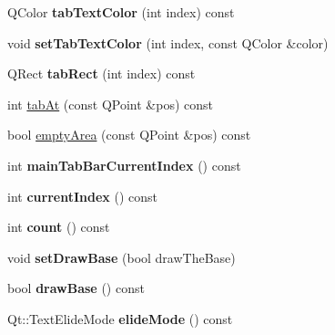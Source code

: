 \begin{DoxyCompactItemize}
\item 
\hypertarget{class_combo_tab_bar_afc67238651ecdce59e33503618580137}{
QColor {\bfseries tabTextColor} (int index) const }
\label{class_combo_tab_bar_afc67238651ecdce59e33503618580137}

\item 
\hypertarget{class_combo_tab_bar_a6634e7fb2e38f48daa439a89db5c24af}{
void {\bfseries setTabTextColor} (int index, const QColor \&color)}
\label{class_combo_tab_bar_a6634e7fb2e38f48daa439a89db5c24af}

\item 
\hypertarget{class_combo_tab_bar_a2301662a027572fb685937a717a05f7b}{
QRect {\bfseries tabRect} (int index) const }
\label{class_combo_tab_bar_a2301662a027572fb685937a717a05f7b}

\item 
int \hyperlink{class_combo_tab_bar_a2ba10737ac0dd8848f97434a9c5814f3}{tabAt} (const QPoint \&pos) const 
\item 
bool \hyperlink{class_combo_tab_bar_a737d267e4cd82efad188b2d5ce601810}{emptyArea} (const QPoint \&pos) const 
\item 
\hypertarget{class_combo_tab_bar_aa768d3a41df71b0d3179f529ff1b0a2f}{
int {\bfseries mainTabBarCurrentIndex} () const }
\label{class_combo_tab_bar_aa768d3a41df71b0d3179f529ff1b0a2f}

\item 
\hypertarget{class_combo_tab_bar_a71a77325f22110bf223f2f9e0faf52bd}{
int {\bfseries currentIndex} () const }
\label{class_combo_tab_bar_a71a77325f22110bf223f2f9e0faf52bd}

\item 
\hypertarget{class_combo_tab_bar_ad30535b80bc7a75ea26106218b8f9110}{
int {\bfseries count} () const }
\label{class_combo_tab_bar_ad30535b80bc7a75ea26106218b8f9110}

\item 
\hypertarget{class_combo_tab_bar_a84a0e639e0c7fda3e7d7b8b37aa4c4b0}{
void {\bfseries setDrawBase} (bool drawTheBase)}
\label{class_combo_tab_bar_a84a0e639e0c7fda3e7d7b8b37aa4c4b0}

\item 
\hypertarget{class_combo_tab_bar_a6586b51cbab448ae0b36ed01d9103845}{
bool {\bfseries drawBase} () const }
\label{class_combo_tab_bar_a6586b51cbab448ae0b36ed01d9103845}

\item 
\hypertarget{class_combo_tab_bar_a3522f6e767f5d4d55de994efdcceb352}{
Qt::TextElideMode {\bfseries elideMode} () const }
\label{class_combo_tab_bar_a3522f6e767f5d4d55de994efdcceb352}


\end{DoxyCompactItemize}
